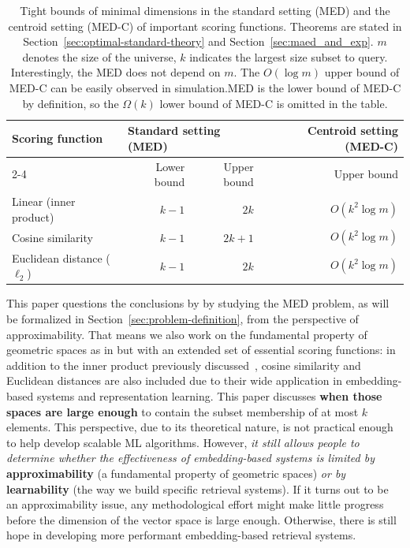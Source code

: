 \begin{table}[]
\caption{Tight bounds of minimal dimensions in the standard setting (MED) and the centroid setting (MED-C) of important scoring functions. Theorems are stated in Section~\ref{sec:optimal-standard-theory} and Section~\ref{sec:maed_and_exp}. $m$ denotes the size of the universe, $k$ indicates the largest size subset to query. Interestingly, the MED does not depend on $m$. The $O(\log m)$ upper bound of MED-C can be easily observed in simulation.MED is the lower bound of MED-C by definition, so the $\Omega(k)$ lower bound of MED-C is omitted in the table.}\label{tab:major_results}
\centering
\begin{tabular}{lrrr}
\toprule
\multirow{2}{*}{Scoring function} & \multicolumn{2}{l}{Standard setting (MED)} & Centroid setting (MED-C) \\\cmidrule{2-4}
                                  & Lower bound       & Upper bound      & Upper bound                             \\\midrule
Linear (inner product)            & $k-1$             & $2k$             & $O(k^2\log m)$                             \\
Cosine similarity                 & $k-1$             & $2k+1$           & $O(k^2\log m)$                              \\
Euclidean distance ($\ell_2$)     & $k-1$             & $2k$             & $O(k^2\log m)$                            \\\bottomrule
\end{tabular}
\end{table}


This paper questions the conclusions by \citet{weller2025theoretical} by studying the MED problem, as will be formalized in Section~\ref{sec:problem-definition}, from the perspective of approximability. That means we also work on the fundamental property of geometric spaces as in \citet{weller2025theoretical} but with an extended set of essential scoring functions: in addition to the inner product previously discussed~\citep{weller2025theoretical}, cosine similarity and Euclidean distances are also included due to their wide application in embedding-based systems and representation learning. This paper discusses \textbf{when those spaces are large enough} to contain the subset membership of at most $k$ elements. This perspective, due to its theoretical nature, is not practical enough to help develop scalable ML algorithms. However, \textit{it still allows people to determine whether the effectiveness of embedding-based systems is limited by} \textbf{approximability} (a fundamental property of geometric spaces) \textit{or by} \textbf{learnability} (the way we build specific retrieval systems). If it turns out to be an approximability issue, any methodological effort might make little progress before the dimension of the vector space is large enough. Otherwise, there is still hope in developing more performant embedding-based retrieval systems.


